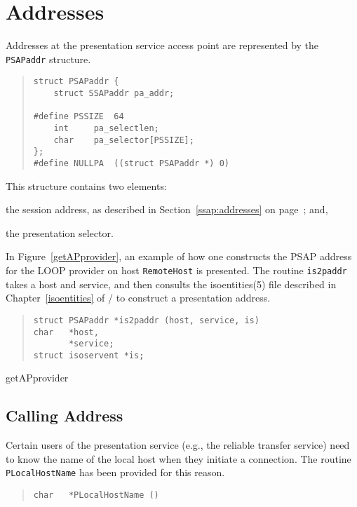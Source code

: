 \section	{Addresses}\label{psap:addresses}
Addresses at the presentation service access point are represented by the
\verb"PSAPaddr" structure.
\begin{quote}\small\begin{verbatim}
struct PSAPaddr {
    struct SSAPaddr pa_addr;

#define PSSIZE  64
    int     pa_selectlen;
    char    pa_selector[PSSIZE];
};
#define NULLPA  ((struct PSAPaddr *) 0)
\end{verbatim}\end{quote}
This structure contains two elements:
\begin{describe}
\item[\verb"pa\_addr":]	the session address,
as described in Section~\ref{ssap:addresses} on page~\pageref{ssap:addresses};
and,

\item[\verb"pa\_selector"/\verb"pa\_selectlen":] the presentation selector.
\end{describe}

In Figure~\ref{getAPprovider},
an example of how one constructs the PSAP address for the LOOP provider on
host \verb"RemoteHost" is presented.
The routine \verb"is2paddr" takes a host and service,
and then consults the \man isoentities(5) file described in
Chapter~\ref{isoentities} of \volone/ to construct a presentation
address.
\begin{quote}\small\begin{verbatim}
struct PSAPaddr *is2paddr (host, service, is)
char   *host,
       *service;
struct isoservent *is;
\end{verbatim}\end{quote}
%
	{getAPprovider}

\subsection	{Calling Address}
Certain users of the presentation service
(e.g., the reliable transfer service)
need to know the name of the local host when they initiate a connection.
The routine \verb"PLocalHostName" has been provided for this reason.
\begin{quote}\small\begin{verbatim}
char   *PLocalHostName ()
\end{verbatim}\end{quote}

